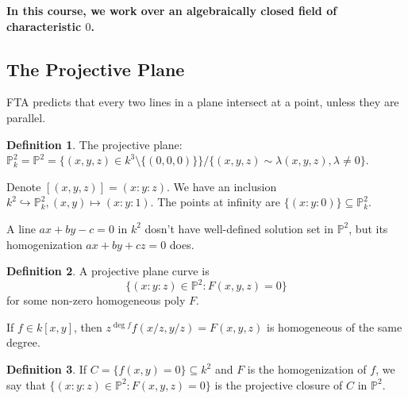 \documentclass{article}
\theoremstyle{definition}
\newtheorem{defn}{Definition}[section]
\theoremstyle{remark}
\theoremstyle{plain}
\newcommand{\PP}{\mathbb{P}}
\begin{document}
\textbf{In this course, we work over an algebraically closed field of characteristic $0$.}

\subsection{The Projective Plane}
FTA predicts that every two lines in a plane intersect at a point, unless they are parallel.
\begin{defn}
    The projective plane: $\PP^2_k=\PP^2=\{(x,y,z)\in k^3\setminus\{(0,0,0)\}\}/\{(x,y,z)\sim\lambda(x,y,z),\lambda\neq 0\}$.
\end{defn}
Denote $[(x,y,z)]=(x:y:z)$. We have an inclusion $k^2\hookrightarrow\PP_k^2, (x,y)\mapsto (x:y:1)$. The points at infinity are $\{(x:y:0)\}\subseteq\PP_k^2$.

A line $ax+by-c=0$ in $k^2$ dosn't have well-defined solution set in $\PP^2$, but its homogenization $ax+by+cz=0$ does.

\begin{defn}
    A projective plane curve is
    \[\{(x:y:z)\in\PP^2\colon F(x,y,z)=0\}\]
    for some non-zero homogeneous poly $F$.
\end{defn}
If $f\in k[x,y]$, then $z^{\deg f}f(x/z,y/z)=F(x,y,z)$ is homogeneous of the same degree.
\begin{defn}
    If $C=\{f(x,y)=0\}\subseteq k^2$ and $F$ is the homogenization of $f$, we say that $\{(x:y:z)\in\PP^2:F(x,y,z)=0\}$ is the projective closure of $C$ in $\PP^2$.
\end{defn}
\end{document}
